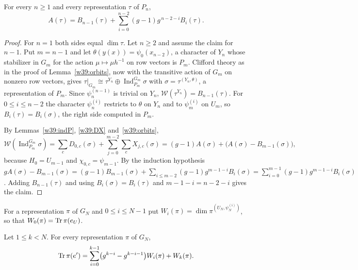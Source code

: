 \begin{proposition}\label{w39:propM}
For every $n\ge1$ and every representation $\tau$ of $P_n$,
\[
A(\tau)=B_{n-1}(\tau)+\sum_{i=0}^{n-2}(g-1)g^{\,n-2-i}B_i(\tau).
\]
\end{proposition}

\begin{proof}
For $n=1$ both sides equal $\dim\tau$. Let $n\ge2$ and assume the claim for $n-1$. Put $m=n-1$ and let $\theta(y(x))=\psi_0(x_{n-2})$, a character of $Y_n$ whose stabilizer in $G_{m}$ for the action $\mu\mapsto\mu h^{-1}$ on row vectors is $P_m$. Clifford theory as in the proof of Lemma~\ref{w39:orbits}, now with the transitive action of $G_m$ on nonzero row vectors, gives $\tau|_{G_m}\cong\tau^{Y_n}\oplus\operatorname{Ind}_{P_m}^{G_m}\sigma$ with $\sigma=\tau^{(Y_n,\theta)}$, a representation of $P_m$. Since $\psi^{(n-1)}_n$ is trivial on $Y_n$, $\mathcal W(\tau^{Y_n})=B_{n-1}(\tau)$. For $0\le i\le n-2$ the character $\psi^{(i)}_n$ restricts to $\theta$ on $Y_n$ and to $\psi^{(i)}_m$ on $U_m$, so $B_i(\tau)=B_i(\sigma)$, the right side computed in $P_m$.

By Lemmas~\ref{w39:indP}, \ref{w39:DX} and~\ref{w39:orbits},
\[
\mathcal W(\operatorname{Ind}_{P_m}^{G_m}\sigma)=\sum_cD_{0,c}(\sigma)+\sum_{j=0}^{m-2}\sum_cX_{j,c}(\sigma)=(g-1)A(\sigma)+\bigl(A(\sigma)-B_{m-1}(\sigma)\bigr),
\]
because $H_0=U_{m-1}$ and $\chi_{0,c}=\psi_{m-1}$. By the induction hypothesis $gA(\sigma)-B_{m-1}(\sigma)=(g-1)B_{m-1}(\sigma)+\sum_{i\le m-2}(g-1)g^{m-1-i}B_i(\sigma)=\sum_{i=0}^{m-1}(g-1)g^{m-1-i}B_i(\sigma)$. Adding $B_{n-1}(\tau)$ and using $B_i(\sigma)=B_i(\tau)$ and $m-1-i=n-2-i$ gives the claim.
\end{proof}

For a representation $\pi$ of $G_N$ and $0\le i\le N-1$ put $W_i(\pi)=\dim\pi^{(U_N,\psi^{(i)}_N)}$, so that $W_0(\pi)=\operatorname{Tr}\pi(e_U)$.

\begin{theorem}\label{w39:thmB}\label{w2x:der}
Let $1\le k<N$. For every representation $\pi$ of $G_N$,
\[
\operatorname{Tr}\pi(e')=\sum_{i=0}^{k-1}\bigl(g^{k-i}-g^{k-i-1}\bigr)W_i(\pi)+W_k(\pi).
\]
\end{theorem}

